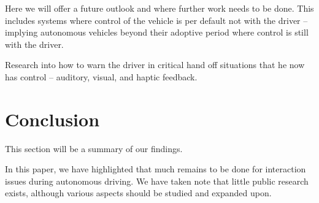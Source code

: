 \documentclass{acm_proc_article-sp}
\begin{document}
Here we will offer a future outlook and where further work needs to be done.
This includes systems where control of the vehicle is per default not with the driver – implying autonomous vehicles beyond their adoptive period where control is still with the driver.

Research into how to warn the driver in critical hand off situations that he now has control – auditory, visual, and haptic feedback.

\section{Conclusion}

This section will be a summary of our findings.

In this paper, we have highlighted that much remains to be done for interaction issues during autonomous driving.
We have taken note that little public research exists, although various aspects should be studied and expanded upon.


  

\balancecolumns
\end{document}
